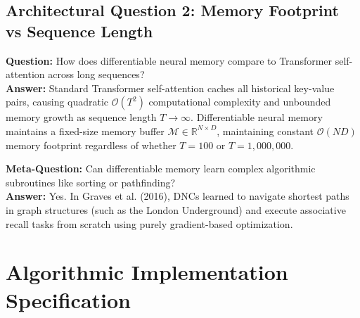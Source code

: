 \documentclass[11pt,a4paper]{article}
\theoremstyle{definition}
\begin{document}
\subsection{Architectural Question 2: Memory Footprint vs Sequence Length}
\textbf{Question:} How does differentiable neural memory compare to Transformer self-attention across long sequences?\\
\textbf{Answer:} Standard Transformer self-attention caches all historical key-value pairs, causing quadratic $\mathcal{O}(T^2)$ computational complexity and unbounded memory growth as sequence length $T \to \infty$. Differentiable neural memory maintains a fixed-size memory buffer $\mathcal{M} \in \mathbb{R}^{N \times D}$, maintaining constant $\mathcal{O}(N D)$ memory footprint regardless of whether $T = 100$ or $T = 1,000,000$.

\textbf{Meta-Question:} Can differentiable memory learn complex algorithmic subroutines like sorting or pathfinding?\\
\textbf{Answer:} Yes. In Graves et al. (2016), DNCs learned to navigate shortest paths in graph structures (such as the London Underground) and execute associative recall tasks from scratch using purely gradient-based optimization.

\section{Algorithmic Implementation Specification}
\end{document}

